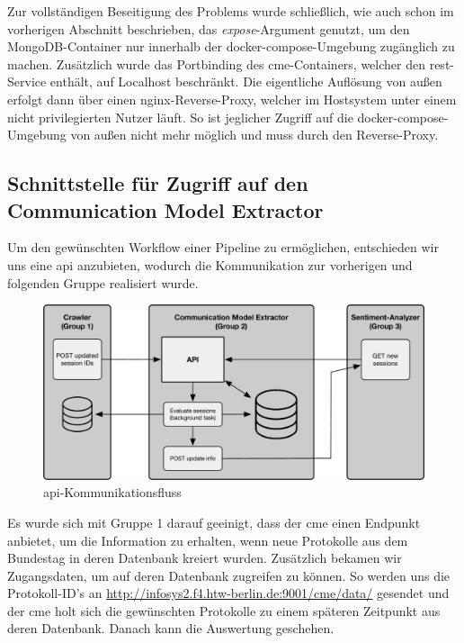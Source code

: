 Zur vollständigen Beseitigung des Problems wurde schließlich, wie auch schon
im vorherigen Abschnitt beschrieben, das \textit{expose}-Argument genutzt,
um den MongoDB-Container nur innerhalb der docker-compose-Umgebung zugänglich
zu machen. Zusätzlich wurde das Portbinding des \gls{cme}-Containers, welcher
den \gls{rest}-Service enthält, auf Localhost beschränkt. Die eigentliche
Auflösung von außen erfolgt dann über einen nginx-Reverse-Proxy, welcher im
Hostsystem unter einem nicht privilegierten Nutzer läuft. So ist jeglicher
Zugriff auf die docker-compose-Umgebung von außen nicht mehr möglich und muss
durch den Reverse-Proxy.

\subsection{Schnittstelle für Zugriff auf den Communication Model Extractor}

Um den gewünschten Workflow einer Pipeline zu ermöglichen, entschieden wir
uns eine \gls{api} anzubieten, wodurch die Kommunikation zur vorherigen und
folgenden Gruppe realisiert wurde.

\begin{figure}[ht]
    \begin{center}
        \includegraphics[width=\textwidth]{images/03-cme/Communications.pdf}
    \end{center}
    \caption{\gls{api}-Kommunikationsfluss}
    \label{fig:03_api_call_flow}
\end{figure}

Es wurde sich mit Gruppe 1 darauf geeinigt, dass der \gls{cme} einen Endpunkt
anbietet, um die Information zu erhalten, wenn neue Protokolle aus dem
Bundestag in deren Datenbank kreiert wurden. Zusätzlich bekamen wir
Zugangsdaten, um auf deren Datenbank zugreifen zu können. So werden uns die
Protokoll-ID's an \url{http://infosys2.f4.htw-berlin.de:9001/cme/data/} gesendet
und der \gls{cme} holt sich die gewünschten Protokolle zu einem späteren Zeitpunkt
aus deren Datenbank. Danach kann die Auswertung geschehen.

